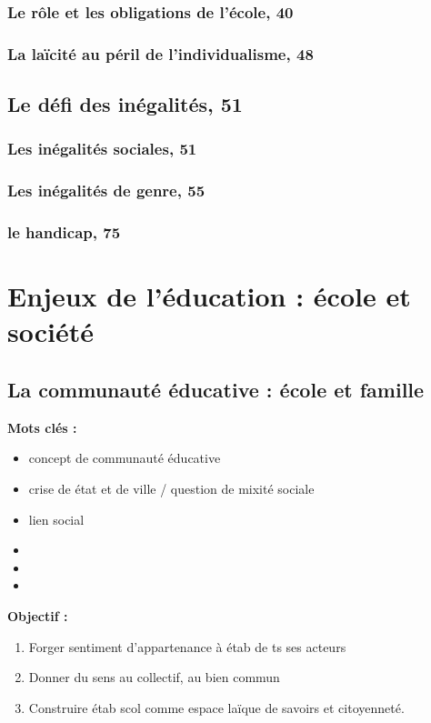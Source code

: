 \documentclass[12pt]{report}
\begin{document}
\begin{itemize}
\section{Le rôle et les obligations de l'école, 40}

\section{La laïcité au péril de l'individualisme, 48}

\chapter{Le défi des inégalités, 51}

\section{Les inégalités sociales, 51}
\section{Les inégalités de genre, 55}
\section{le handicap, 75}

\part{Enjeux de l'éducation : école et société}

\chapter{La communauté éducative : école et famille}

\textbf{Mots clés : }
\begin{itemize}
\item concept de communauté éducative
\item crise de état et de ville / question de mixité sociale
\item lien social
\item 
\item 
\item 
\end{itemize}

\vspace{0.5cm}

\textbf{Objectif :}


\begin{enumerate}
\item Forger sentiment d'appartenance à étab de ts ses acteurs\\
\item Donner du sens au collectif, au bien commun\\
\item Construire étab scol comme espace laïque de savoirs et citoyenneté.\\
\end{enumerate}


\end{itemize}
\end{document}
